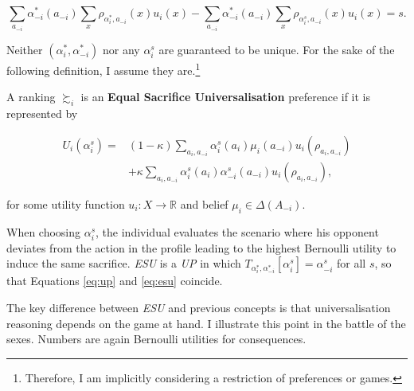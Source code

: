 \begin{equation}\label{eq:sacrifice}
	\sum_{a_{-i}} \alpha^{*}_{-i} ( a_{-i} ) \sum_{x} \rho_{\alpha^{*}_i,a_{-i}} ( x ) u_i ( x ) - \sum_{a_{-i}} \alpha^{*}_{-i} ( a_{-i} ) \sum_{x} \rho_{\alpha^{s}_i,a_{-i}} ( x ) u_i ( x ) = s .
\end{equation}

Neither \((\alpha^{*}_i, \alpha^{*}_{-i} )\) nor any \(\alpha_i^s\) are guaranteed to be unique. For the sake of the following definition, I assume they are.\footnote{Therefore, I am implicitly considering a restriction of preferences or games.}

\begin{definition}\label{def:esu}
	A ranking \( \succsim_i \) is an \textbf{Equal Sacrifice Universalisation} preference if it is represented by

	\begin{equation}\label{eq:esu}
		\begin{aligned}
			U_i ( \alpha^{s}_{i} ) = {} & (1-\kappa )\sum_{a_i, a_{-i}} \alpha^{s}_{i} (a_i) \mu_{i}(a_{-i}) u_i(\rho_{a_i, a_{-i}})         \\[1mm]
			{}                                     & + \kappa \sum_{a_i, a_{-i}} \alpha^{s}_{i} (a_i) \alpha^{s}_{-i} (a_{-i}) u_i(\rho_{a_i, a_{-i}}),
		\end{aligned}
	\end{equation}

	for some utility function \(u_i \colon X \rightarrow \mathbb{R}\) and belief \(\mu_i \in \Delta (A_{-i} )\).
\end{definition}

When choosing \(\alpha^{s}_i\), the individual evaluates the scenario where his opponent deviates from the action in the profile leading to the highest Bernoulli utility to induce the same sacrifice. \textit{ESU} is a \textit{UP} in which \( T_{\alpha^{*}_i, \alpha^{*}_{-i}} [ \alpha^s_i ] = \alpha_{-i}^s \) for all \( s \), so that Equations \eqref{eq:up} and \eqref{eq:esu} coincide.

The key difference between \textit{ESU} and previous concepts is that universalisation reasoning depends on the game at hand. I illustrate this point in the battle of the sexes. Numbers are again Bernoulli utilities for consequences.

